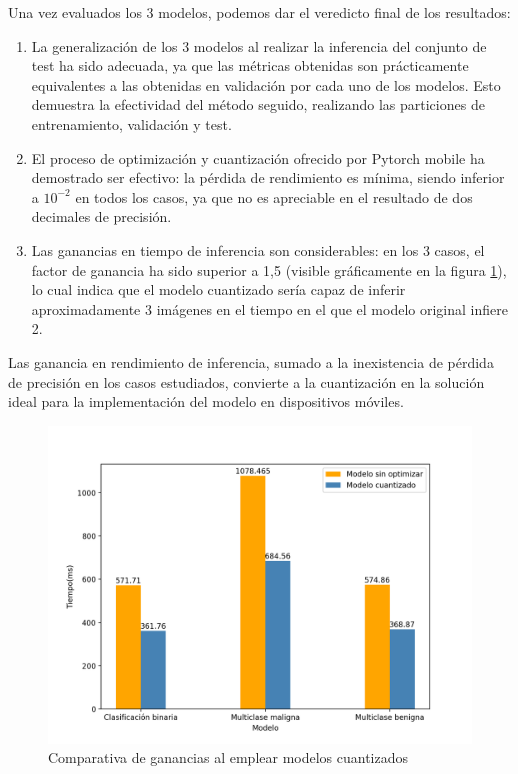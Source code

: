 Una vez evaluados los 3 modelos, podemos dar el veredicto final de los resultados:
\begin{enumerate}
	\item La generalización de los 3 modelos al realizar la inferencia del conjunto de test ha sido adecuada, ya que las métricas obtenidas son prácticamente equivalentes a las obtenidas en validación por cada uno de los modelos. Esto demuestra la efectividad del método seguido, realizando las particiones de entrenamiento, validación y test.
	\item El proceso de optimización y cuantización ofrecido por Pytorch mobile \cite{pmobile} ha demostrado ser efectivo: la pérdida de rendimiento es mínima, siendo inferior a $10^{-2}$ en todos los casos, ya que no es apreciable en el resultado de dos decimales de precisión.
	\item Las ganancias en tiempo de inferencia son considerables: en los 3 casos, el factor de ganancia ha sido superior a 1,5 (visible gráficamente en la figura \ref{fig:gananciasquant}), lo cual indica que el modelo cuantizado sería capaz de inferir aproximadamente 3 imágenes en el tiempo en el que el modelo original infiere 2. 
	\end{enumerate}
	
	Las ganancia en rendimiento de inferencia, sumado a la inexistencia de pérdida de precisión en los casos estudiados, convierte a la cuantización en la solución ideal para la implementación del modelo en dispositivos móviles.
	
	\begin{figure}[H]
		\centering
		\includegraphics[scale = 0.55]{imagenes/tiempoinferencia.png}
		\caption{Comparativa de ganancias al emplear  modelos cuantizados}
		\label{fig:gananciasquant}
	\end{figure}
